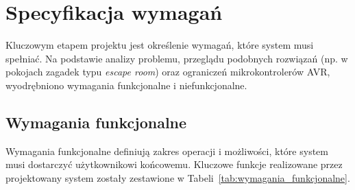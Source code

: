\documentclass{SGGW-thesis}
\begin{document}
\section{Specyfikacja wymagań}
Kluczowym etapem projektu jest określenie wymagań, które system musi spełniać. Na podstawie analizy problemu, przeglądu podobnych rozwiązań (np. w pokojach zagadek typu \textit{escape room}) oraz ograniczeń mikrokontrolerów AVR, wyodrębniono wymagania funkcjonalne i niefunkcjonalne.

\subsection{Wymagania funkcjonalne}
Wymagania funkcjonalne definiują zakres operacji i możliwości, które system musi dostarczyć użytkownikowi końcowemu. Kluczowe funkcje realizowane przez projektowany system zostały zestawione w Tabeli~\ref{tab:wymagania_funkcjonalne}.
\end{document}
